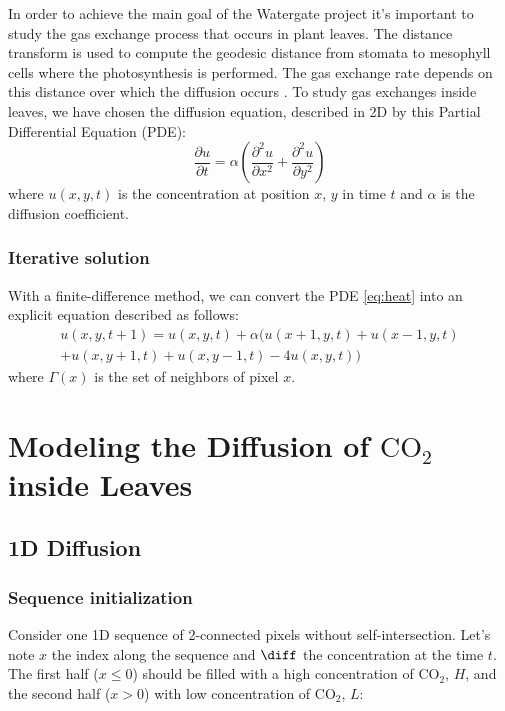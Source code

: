 In order to achieve the main goal of the Watergate project it's important to study the
gas exchange process that occurs in plant leaves. The distance transform is used to
compute the geodesic distance from stomata to mesophyll cells where the photosynthesis
is performed. The gas exchange rate depends on this distance over which the diffusion 
occurs \cite{RSB}. To study gas exchanges inside leaves, we have chosen the diffusion
equation, described in 2D by this Partial Differential Equation (PDE):
%
\begin{equation}
  \frac{\partial u}{\partial t} = \alpha \left( \frac{\partial^2u}{\partial x^2} + \frac{\partial^2u}{\partial y^2} \right)
  \label{eq:heat}
\end{equation}
%
where $u(x,y,t)$ is the concentration at position $x$, $y$ in time $t$ and $\alpha$ is the
diffusion coefficient.

\subsubsection{Iterative solution}

With a finite-difference method, we can convert the PDE \eqref{eq:heat} into an explicit 
equation described as follows:
%
\begin{multline}
    u(x,y,t+1) = u(x,y,t) + \alpha \big(
        u(x+1,y,t) + u(x-1,y,t) \\
        + u(x,y+1,t) + u(x,y-1,t) 
        - 4 u(x,y,t)
        \big)
    \label{eq:iterative}
\end{multline}
%
where $\Gamma(x)$ is the set of neighbors of pixel $x$.

\section{Modeling the Diffusion of \texorpdfstring{$\mathrm{CO_2}$}{CO2} inside Leaves}

\subsection{1D Diffusion}

\subsubsection{Sequence initialization}

Consider one 1D sequence of 2-connected pixels without self-intersection.
Let's note $x$ the index along the sequence and $\diff$ the concentration at the 
time $t$. The first half ($x \le 0$) should be filled with a high concentration
of $\mathrm{CO_2}$, $H$, and the second half ($x > 0$) with low concentration 
of $\mathrm{CO_2}$, $L$:

